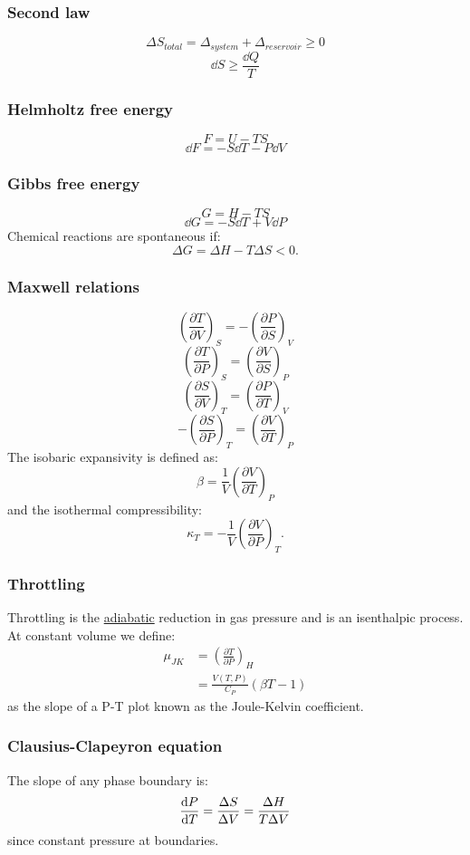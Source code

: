 \documentclass{article}
\begin{document}
\begin{multicols*}{3}
\subsubsection*{Second law}
$$\Delta S_{total}=\Delta_{system}
+\Delta_{reservoir}\geq0$$
$$\dd S\geq\frac{\dd Q}{T}$$

\subsubsection*{Helmholtz free energy}
$$F=U-TS$$
$$\dd F=-S\dd T-P\dd V$$

\subsubsection*{Gibbs free energy}
$$G=H-TS$$
$$\dd G=-S\dd T+V\dd P$$
Chemical reactions are spontaneous if:
$$\Delta G=\Delta H-T\Delta S<0.$$

\subsubsection*{Maxwell relations}
$$\left(\frac{\partial T}{\partial V}\right)_S
=-\left(\frac{\partial P}{\partial S}\right)_V$$
$$\left(\frac{\partial T}{\partial P}\right)_S
=\left(\frac{\partial V}{\partial S}\right)_P$$
$$\left(\frac{\partial S}{\partial V}\right)_T
=\left(\frac{\partial P}{\partial T}\right)_V$$
$$-\left(\frac{\partial S}{\partial P}\right)_T
=\left(\frac{\partial V}{\partial T}\right)_P$$
The isobaric expansivity is defined as:
$$\beta=\frac{1}{V}
\left(\frac{\partial V}{\partial T}\right)_P$$
and the isothermal compressibility:
$$\kappa_T=-\frac{1}{V}
\left(\frac{\partial V}{\partial P}\right)_T.$$

\subsubsection*{Throttling}
Throttling is the \underline{adiabatic} 
reduction in gas pressure
and is an isenthalpic process.
At constant volume we define:
\begin{align*}
    \mu_{JK}&=\left(
    \frac{\partial T}{\partial P}\right)_H \\
    &=\frac{V(T,P)}{C_P}(\beta T-1)
\end{align*}
as the slope of a P-T plot
known as the
Joule-Kelvin coefficient.

\subsubsection*{Clausius-Clapeyron equation}
The slope of any phase boundary is:
$$\dv{P}{T}=\frac{\Delta S}{\Delta V}
=\frac{\Delta H}{T\Delta V}$$
since constant pressure at boundaries.


\end{multicols*}
\end{document}
